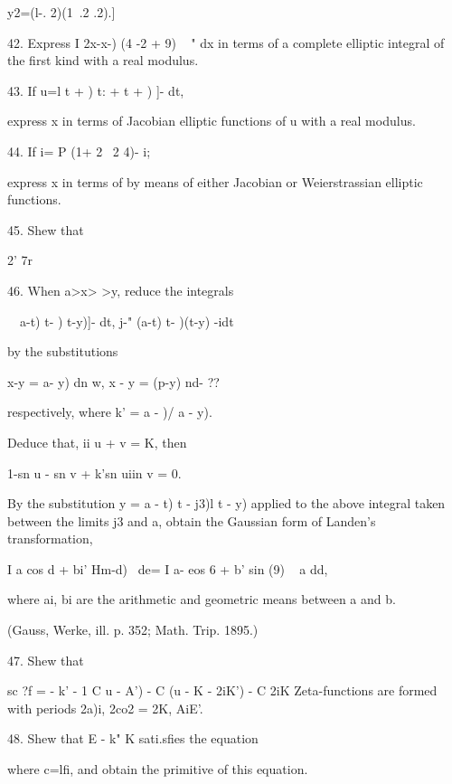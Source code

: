 y2=(l-. 2)(1\ .2 .2).]

42. Express I 2x-x-) (4 -2 + 9) ~ " dx in terms of a complete elliptic
integral of the first kind with a real modulus. 

43. If u=l t + ) t: + t + ) ]- dt,

express x in terms of Jacobian elliptic functions of u with a real
modulus.


44. If i= P (1+ 2 \ 2 4)- i;

express x in terms of by means of either Jacobian or Weierstrassian
elliptic functions.


45. Shew that

2' 7r


46. When a>x> >y, reduce the integrals

\ \ a-t) t- ) t-y)]- dt, j-" (a-t) t- )(t-y) -idt

by the substitutions

x-y = a- y) dn w, x - y = (p-y) nd- ??

respectively, where k' = a - )/ a - y).

Deduce that, ii u + v = K, then

1-sn u - sn v + k'sn uiin v = 0.

By the substitution y = a - t) t - j3)l t - y) applied to the above
integral taken between the limits j3 and a, obtain the Gaussian form
of Landen's transformation,

I a cos d + bi' Hm-d)~ de= I a- eos 6 + b' sin (9) ~ a dd,

where ai, bi are the arithmetic and geometric means between a and b.

(Gauss, Werke, ill. p. 352; Math. Trip. 1895.)

%
%

47. Shew that

sc ?f = - k' - 1 C u - A') - C (u - K - 2iK') - C 2iK%
Zeta-functions are formed with periods 2a)i, 2co2 = 2K, AiE'.


48. Shew that E - k" K sati.sfies the equation

where c=lfi, and obtain the primitive of this equation.

